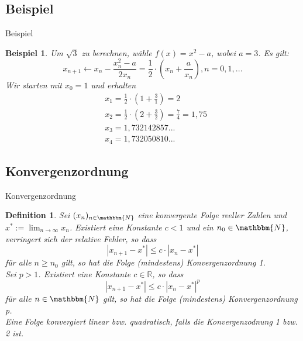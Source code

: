 \documentclass{beamer}
\newcommand{\N}{\mathbbm{N}} %
\newcommand{\R}{\mathbb{R}} %
\newtheorem{defi}[satz]{Definition}
\newtheorem{beispiel}[satz]{Beispiel}
\begin{document}
   \subsection{Beispiel}
    \begin{frame}{Beispiel}
        \begin{beispiel}
    Um $\sqrt{3}$ zu berechnen, wähle $f(x)= x^2-a$, wobei $a=3$. Es gilt: 
    \begin{equation*}
        x_{n+1} \leftarrow x_n - \frac{x_n^2-a}{2x_n}= \frac{1}{2} \cdot \left(x_n+ \frac{a}{x_n}\right), n=0,1,...
    \end{equation*}
    Wir starten mit $x_0=1$ und erhalten
    \begin{align*}
        &x_1= \frac{1}{2} \cdot \left( 1+\frac{3}{1}\right)=2 \\
        &x_2= \frac{1}{2} \cdot \left( 2+ \frac{3}{2} \right)= \frac{7}{4}=1,75 \\
        &x_3= 1,732142857... \\
        &x_4= 1,732050810...
    \end{align*}
    \end{beispiel}
    \end{frame}
   \subsection{Konvergenzordnung} 
    \begin{frame}{Konvergenzordnung}
        \begin{defi}
          Sei $(x_n)_{n \in \N}$ eine konvergente Folge reeller Zahlen und $x^*:= \lim_{n \to \infty}x_n$. Existiert eine Konstante $c<1$ und ein $n_0 \in \N$, verringert sich der relative Fehler, so dass 
           \begin{equation*}
             |x_{n+1}-x^*| \leq c \cdot |x_n -x^*|
           \end{equation*}
         für alle $n \geq n_0$ gilt, so hat die Folge (mindestens) Konvergenzordnung 1. \\
         Sei $p>1$. Existiert eine Konstante $c \in \R$, so dass
           \begin{equation*}
             |x_{n+1}-x^*| \leq c \cdot |x_n-x^*|^p
            \end{equation*}
         für alle $n \in \N$ gilt, so hat die Folge (mindestens) Konvergenzordnung p. \\
         Eine Folge konvergiert linear bzw. quadratisch, falls die Konvergenzodnung 1 bzw. 2 ist.
      \end{defi}
    \end{frame}
\end{document}
